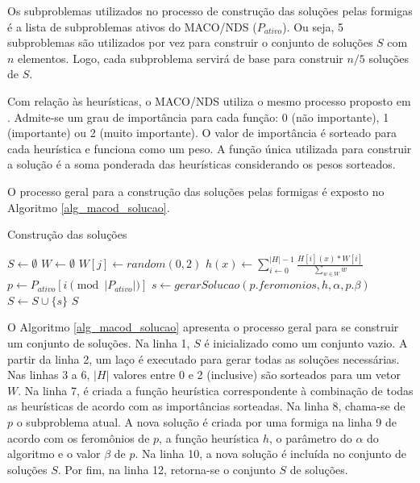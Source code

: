 Os subproblemas utilizados no processo de construção das soluções pelas formigas é a lista de subproblemas ativos do MACO/NDS ($P_{ativo}$). Ou seja, 5 subproblemas são utilizados por vez para construir o conjunto de soluções $S$ com $n$ elementos. Logo, cada subproblema servirá de base para construir $n/5$ soluções de $S$.

Com relação às heurísticas, o MACO/NDS utiliza o mesmo processo proposto em \cite{Riveros2016}. Admite-se um grau de importância para cada função: 0 (não importante), 1 (importante) ou 2 (muito importante). O valor de importância é sorteado para cada heurística e funciona como um peso. A função única utilizada para construir a solução é a soma ponderada das heurísticas considerando os pesos sorteados.

O processo geral para a construção das soluções pelas formigas é exposto no Algoritmo \ref{alg_macod_solucao}.

\begin{algorithm}
	\caption{Construção das soluções}
	\label{alg_macod_solucao}
	\begin{algorithmic}[1]
		\State $S \gets \emptyset$
		\State $W \gets \emptyset$
		\State $W[j] \gets random(0,2)$
		\EndFor
		\State $h(x) \gets \sum_{i \gets 0}^{|H|-1}\frac{H[i](x) * W[i]}{\sum\limits_{w \in W}w}$
		\State $p \gets P_{ativo}[i \pmod{|P_{ativo}|}]$
		\State $s \gets gerarSolucao(p.feromonios, h, \alpha, p.\beta)$
		\State $S \gets S \cup \{s\}$
		\EndFor
		\State \Return $S$
	\end{algorithmic}
\end{algorithm}

O Algoritmo \ref{alg_macod_solucao} apresenta o processo geral para se construir um conjunto de soluções. Na linha 1, $S$ é inicializado como um conjunto vazio. A partir da linha 2, um laço é executado para gerar todas as soluções necessárias. Nas linhas 3 a 6, $|H|$ valores entre 0 e 2 (inclusive) são sorteados para um vetor $W$. Na linha 7, é criada a função heurística correspondente à combinação de todas as heurísticas de acordo com as importâncias sorteadas. Na linha 8, chama-se de $p$ o subproblema atual. A nova solução é criada por uma formiga na linha 9 de acordo com os feromônios de $p$, a função heurística $h$, o parâmetro do $\alpha$ do algoritmo e o valor $\beta$ de $p$. Na linha 10, a nova solução é incluída no conjunto de soluções $S$. Por fim, na linha 12, retorna-se o conjunto $S$ de soluções.

